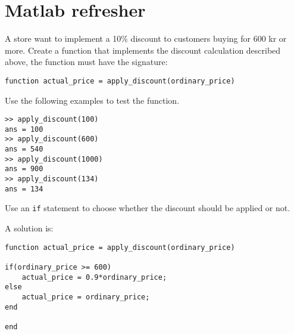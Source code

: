 \section{Matlab refresher}

\begin{ex}
A store want to implement a 10\% discount to customers 
buying for 600 kr or more.
Create a function that implements the discount calculation
described above, the function must have the signature:
\begin{lstlisting}
function actual_price = apply_discount(ordinary_price)
\end{lstlisting}
Use the following examples to test the function.
\begin{lstlisting}
>> apply_discount(100)
ans = 100
>> apply_discount(600)
ans = 540
>> apply_discount(1000)
ans = 900
>> apply_discount(134)
ans = 134
\end{lstlisting}
\begin{hint}
Use an \verb!if! statement to choose whether the 
discount should be applied or not.
\end{hint}
\begin{sol}
A solution is:
\begin{lstlisting}
function actual_price = apply_discount(ordinary_price)

if(ordinary_price >= 600)
    actual_price = 0.9*ordinary_price;
else
    actual_price = ordinary_price;
end

end
\end{lstlisting}
\end{sol}
\end{ex}




